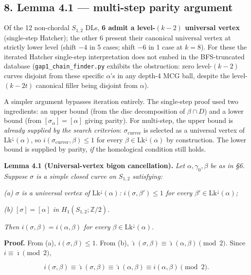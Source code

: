 \documentclass[
]{article}
\begin{document}
\subsection{8. Lemma 4.1 --- multi-step parity
argument}\label{lemma-4.1-multi-step-parity-argument}

Of the 12 non-chordal \(S_{1,2}\) DLs, \textbf{6 admit a level-\((k-2)\)
universal vertex} (single-step Hatcher); the other 6 present their
canonical universal vertex at strictly lower level (shift \(-4\) in 5
cases; shift \(-6\) in 1 case at \(k = 8\)). For these the iterated
Hatcher single-step interpretation does not embed in the BFS-truncated
database (\texttt{gap1\_chain\_finder.py} exhibits the obstruction: zero
level-\((k-2)\) curves disjoint from these specific \(\alpha\)'s in any
depth-4 MCG ball, despite the level-\((k-2t)\) canonical filler being
disjoint from \(\alpha\)).

A simpler argument bypasses iteration entirely. The single-step proof
used two ingredients: an upper bound (from the disc decomposition of
\(\beta \cap D\)) and a lower bound (from \([\sigma_\alpha] = [\alpha]\)
giving parity). For multi-step, the upper bound is \emph{already
supplied by the search criterion}: \(\sigma_\mathrm{curver}\) is
selected as a universal vertex of \(\mathrm{Lk}^\downarrow(\alpha)\), so
\(i(\sigma_\mathrm{curver}, \beta) \le 1\) for every
\(\beta \in \mathrm{Lk}^\downarrow(\alpha)\) by construction. The lower
bound is supplied by parity, \emph{if} the homological condition still
holds.

\textbf{Lemma 4.1 (Universal-vertex bigon cancellation).} \emph{Let
\(\alpha, \gamma_0, \beta\) be as in §6. Suppose \(\sigma\) is a simple
closed curve on \(S_{1,2}\) satisfying:}

\emph{(a) \(\sigma\) is a universal vertex of
\(\mathrm{Lk}^\downarrow(\alpha)\): \(i(\sigma, \beta') \le 1\) for
every \(\beta' \in \mathrm{Lk}^\downarrow(\alpha)\);}

\emph{(b) \([\sigma] = [\alpha]\) in \(H_1(S_{1,2}; \mathbb Z/2)\).}

\emph{Then \(i(\sigma, \beta) = i(\alpha, \beta)\) for every
\(\beta \in \mathrm{Lk}^\downarrow(\alpha)\).}

\textbf{Proof.} From (a), \(i(\sigma, \beta) \le 1\). From (b),
\(\hat\imath(\sigma, \beta) \equiv \hat\imath(\alpha, \beta) \pmod 2\).
Since \(i \equiv \hat\imath \pmod 2\),

\[
i(\sigma, \beta) \equiv \hat\imath(\sigma, \beta) \equiv \hat\imath(\alpha, \beta) \equiv i(\alpha, \beta) \pmod 2.
\]
\end{document}
